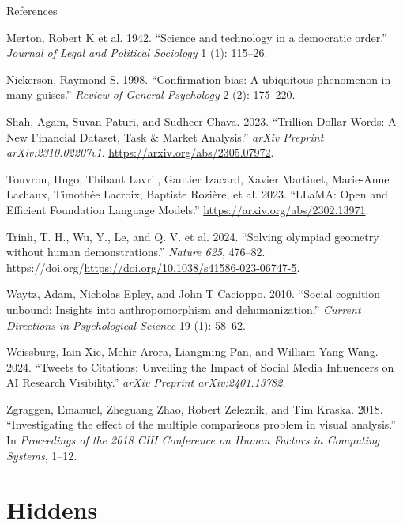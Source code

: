 \documentclass[
  10pt,
  ignorenonframetext,
  aspectratio=169,
  notheorems]{beamer}
\newlength{\cslhangindent}
\newenvironment{CSLReferences}[2] %
 {\begin{list}{}{%
  \setlength{\itemindent}{0pt}
  \setlength{\leftmargin}{0pt}
  \setlength{\parsep}{0pt}
  \ifodd #1
   \setlength{\leftmargin}{\cslhangindent}
   \setlength{\itemindent}{-1\cslhangindent}
  \fi
  \setlength{\itemsep}{#2\baselineskip}}}
 {\end{list}}
\begin{document}
\begin{frame}{References}
\begin{CSLReferences}{1}{0}
Merton, Robert K et al. 1942. {``{Science and technology in a democratic
order}.''} \emph{Journal of Legal and Political Sociology} 1 (1):
115--26.

Nickerson, Raymond S. 1998. {``{Confirmation bias: A ubiquitous
phenomenon in many guises}.''} \emph{Review of General Psychology} 2
(2): 175--220.

Shah, Agam, Suvan Paturi, and Sudheer Chava. 2023. {``{Trillion Dollar
Words: A New Financial Dataset, Task \& Market Analysis}.''} \emph{arXiv
Preprint arXiv:2310.02207v1}. \url{https://arxiv.org/abs/2305.07972}.

Touvron, Hugo, Thibaut Lavril, Gautier Izacard, Xavier Martinet,
Marie-Anne Lachaux, Timothée Lacroix, Baptiste Rozière, et al. 2023.
{``{LLaMA: Open and Efficient Foundation Language Models}.''}
\url{https://arxiv.org/abs/2302.13971}.

Trinh, T. H., Wu, Y., Le, and Q. V. et al. 2024. {``{Solving olympiad
geometry without human demonstrations.}''} \emph{Nature 625}, 476--82.
https://doi.org/\url{https://doi.org/10.1038/s41586-023-06747-5}.

Waytz, Adam, Nicholas Epley, and John T Cacioppo. 2010. {``{Social
cognition unbound: Insights into anthropomorphism and
dehumanization}.''} \emph{Current Directions in Psychological Science}
19 (1): 58--62.

Weissburg, Iain Xie, Mehir Arora, Liangming Pan, and William Yang Wang.
2024. {``{Tweets to Citations: Unveiling the Impact of Social Media
Influencers on AI Research Visibility}.''} \emph{arXiv Preprint
arXiv:2401.13782}.

Zgraggen, Emanuel, Zheguang Zhao, Robert Zeleznik, and Tim Kraska. 2018.
{``{Investigating the effect of the multiple comparisons problem in
visual analysis}.''} In \emph{Proceedings of the 2018 CHI Conference on
Human Factors in Computing Systems}, 1--12.

\end{CSLReferences}
\end{frame}

\section{Hiddens}\label{hiddens}
\end{document}
